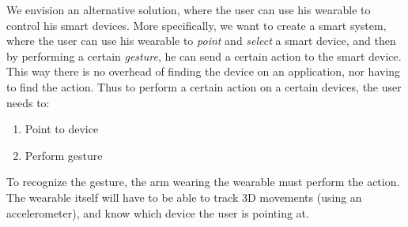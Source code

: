 We envision an alternative solution, 
where the user can use his wearable to control his smart devices. 
More specifically, we want to create a smart system, 
where the user can use his wearable to \emph{point} and \emph{select} a smart device, 
and then by performing a certain \emph{gesture}, 
he can send a certain action to the smart device.
This way there is no overhead of finding the device on an application, 
nor having to find the action. 
Thus to perform a certain action on a certain devices, the user needs to:
\begin{enumerate}
  \item Point to device
  \item Perform gesture
\end{enumerate}

To recognize the gesture, the arm wearing the wearable must perform the action. 
The wearable itself will have to be able to track 3D movements (using \eg an accelerometer), 
and know which device the user is pointing at. 



%
